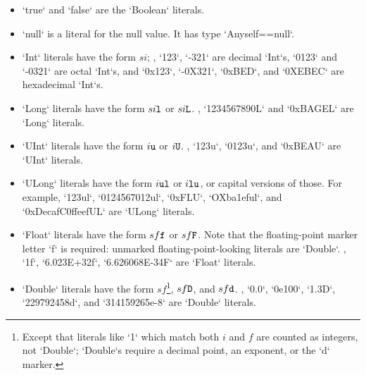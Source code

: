 \begin{itemize}

\item \xcd`true` and \xcd`false` are the \xcd`Boolean` literals. 

\item \xcd`null` is a literal for the null value.  It has type
      \xcd`Any{self==null}`.  

\item {}
\xcd`Int` literals have the form {$si$}; \eg, \xcd`123`,
      \xcd`-321` are decimal \xcd`Int`s, \xcd`0123` and \xcd`-0321` are octal
      \xcd`Int`s, and \xcd`0x123`, \xcd`-0X321`,  \xcd`0xBED`, and \xcd`0XEBEC` are
      hexadecimal \xcd`Int`s.  

\item \xcd`Long` literals have the form {$si{\tt l}$} or
      {$si{\tt L}$}. \Eg, \xcd`1234567890L`  and \xcd`0xBAGEL` are \xcd`Long` literals. 

\item \xcd`UInt` literals have the form {$i{\tt u}$} or {$i {\tt U}$}.
      \Eg, \xcd`123u`, \xcd`0123u`, and \xcd`0xBEAU` are \xcd`UInt` literals.

\item \xcd`ULong` literals have the form {$i {\tt ul}$} or {$i {\tt
      lu}$}, or capital versions of those.  For example, 
      \xcd`123ul`, \xcd`0124567012ul`,  \xcd`0xFLU`, \xcd`OXba1eful`, and \xcd`0xDecafC0ffeefUL` are \xcd`ULong`
      literals. 

\item \xcd`Float` literals have the form {$s f {\tt f}$} or  {$s
\index{float!literal}
\index{literal!float}
      f {\tt F}$}.  Note that the floating-point marker letter \xcd`f` is
      required: unmarked floating-point-looking literals are \xcd`Double`. 
      \Eg, \xcd`1f`, \xcd`6.023E+32f`, \xcd`6.626068E-34F` are \xcd`Float`
      literals. 

\item \xcd`Double` literals have the form {$s f$}\footnote{Except that
      literals like \xcd`1` 
      which match both {$i$} and {$f$} are counted as
      integers, not \xcd`Double`; \xcd`Double`s require a decimal
      point, an exponent, or the \xcd`d` marker.
      }, {$s f {\tt
      D}$}, and {$s f {\tt d}$}.  
      \Eg, \xcd`0.0`, \xcd`0e100`, \xcd`1.3D`,  \xcd`229792458d`, and \xcd`314159265e-8`
      are \xcd`Double` literals.


\end{itemize}
